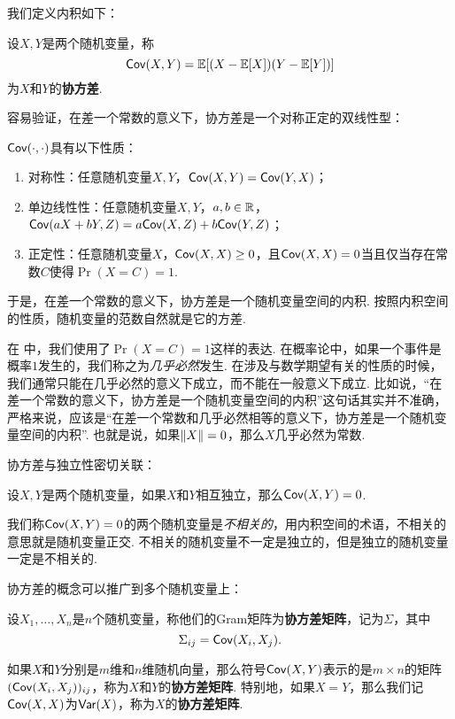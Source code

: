 我们定义内积如下：

\begin{definition}[协方差] 
设$X,Y$是两个随机变量，称
\[\mathsf{Cov}(X,Y)=\mathbb{E}[(X-\mathbb{E}[X])(Y-\mathbb{E}[Y])]\]
为$X$和$Y$的\textbf{协方差}. 
\end{definition}

容易验证，在差一个常数的意义下，协方差是一个对称正定的双线性型：

\begin{proposition}\label{prop:covariance-inner-product}
$\mathsf{Cov}(\cdot,\cdot)$具有以下性质：
\begin{enumerate}
    \item 对称性：任意随机变量$X,Y$，$\mathsf{Cov}(X,Y)=\mathsf{Cov}(Y,X)$；
    \item 单边线性性：任意随机变量$X,Y$，$a,b\in\mathbb{R}$，$\mathsf{Cov}(aX+bY,Z)=a\mathsf{Cov}(X,Z)+b\mathsf{Cov}(Y,Z)$；
    \item 正定性：任意随机变量$X$，$\mathsf{Cov}(X,X)\geq 0$，且$\mathsf{Cov}(X,X)=0$当且仅当存在常数$C$使得$\Pr(X=C)=1$.
\end{enumerate}
\end{proposition}

于是，在差一个常数的意义下，协方差是一个随机变量空间的内积. 按照内积空间的性质，随机变量的范数自然就是它的方差. 

\begin{remark}
    在 中，我们使用了$\Pr(X=C)=1$这样的表达. 在概率论中，如果一个事件是概率$1$发生的，我们称之为\emph{几乎必然}发生. 在涉及与数学期望有关的性质的时候，我们通常只能在几乎必然的意义下成立，而不能在一般意义下成立. 比如说，“在差一个常数的意义下，协方差是一个随机变量空间的内积”这句话其实并不准确，严格来说，应该是“在差一个常数和几乎必然相等的意义下，协方差是一个随机变量空间的内积”. 也就是说，如果$\left\|X\right\|=0$，那么$X$几乎必然为常数.
\end{remark}

协方差与独立性密切关联：

\begin{proposition}\label{prop:independent-covariance}
设$X,Y$是两个随机变量，如果$X$和$Y$相互独立，那么$\mathsf{Cov}(X,Y)=0$.
\end{proposition}

我们称$\mathsf{Cov}(X,Y)=0$的两个随机变量是\emph{不相关的}，用内积空间的术语，不相关的意思就是随机变量正交. 不相关的随机变量不一定是独立的，但是独立的随机变量一定是不相关的. 

协方差的概念可以推广到多个随机变量上：

\begin{definition}[协方差矩阵]
设$X_1,\dots,X_n$是$n$个随机变量，称他们的Gram矩阵为\textbf{协方差矩阵}，记为$\Sigma$，其中
\[\Sigma_{ij}=\mathsf{Cov}(X_i,X_j).\]

如果$X$和$Y$分别是$m$维和$n$维随机向量，那么符号$\mathsf{Cov}(X,Y)$表示的是$m\times n$的矩阵$(\mathsf{Cov}(X_i,X_j))_{ij}$，称为$X$和$Y$的\textbf{协方差矩阵}. 特别地，如果$X=Y$，那么我们记$\mathsf{Cov}(X,X)$为$\mathsf{Var}(X)$，称为$X$的\textbf{协方差矩阵}. 
\end{definition}

